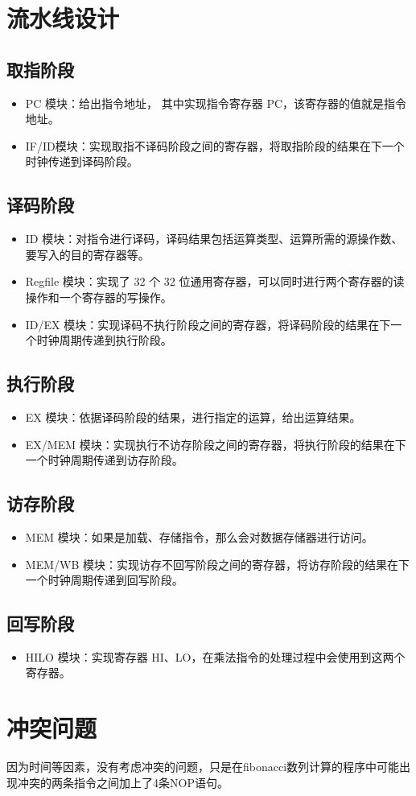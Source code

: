 \section{流水线设计}
	\subsection{取指阶段}
	\begin{itemize}
		\item PC 模块：给出指令地址， 其中实现指令寄存器 PC，该寄存器的值就是指令地址。
		\item IF/ID模块：实现取指不译码阶段之间的寄存器，将取指阶段的结果在下一个时钟传递到译码阶段。
	\end{itemize}
	
	
	\subsection{译码阶段}
	\begin{itemize}
		\item ID 模块：对指令进行译码，译码结果包括运算类型、运算所需的源操作数、要写入的目的寄存器等。
		\item Regfile 模块：实现了 32 个 32 位通用寄存器，可以同时进行两个寄存器的读操作和一个寄存器的写操作。
		\item ID/EX 模块：实现译码不执行阶段之间的寄存器，将译码阶段的结果在下一个时钟周期传递到执行阶段。
	\end{itemize}
	
	
	\subsection{执行阶段}
	\begin{itemize}
		\item EX 模块：依据译码阶段的结果，进行指定的运算，给出运算结果。
		\item EX/MEM 模块：实现执行不访存阶段之间的寄存器，将执行阶段的结果在下一个时钟周期传递到访存阶段。
	\end{itemize}
	
	
	\subsection{访存阶段}
	\begin{itemize}
		\item MEM 模块：如果是加载、存储指令，那么会对数据存储器进行访问。
		\item MEM/WB 模块：实现访存不回写阶段之间的寄存器，将访存阶段的结果在下一个时钟周期传递到回写阶段。
	\end{itemize}


	\subsection{回写阶段}
	\begin{itemize}
		\item HILO 模块：实现寄存器 HI、LO，在乘法指令的处理过程中会使用到这两个寄存器。
	\end{itemize}
	
	
\section{冲突问题}
	因为时间等因素，没有考虑冲突的问题，只是在fibonacci数列计算的程序中可能出现冲突的两条指令之间加上了4条NOP语句。
